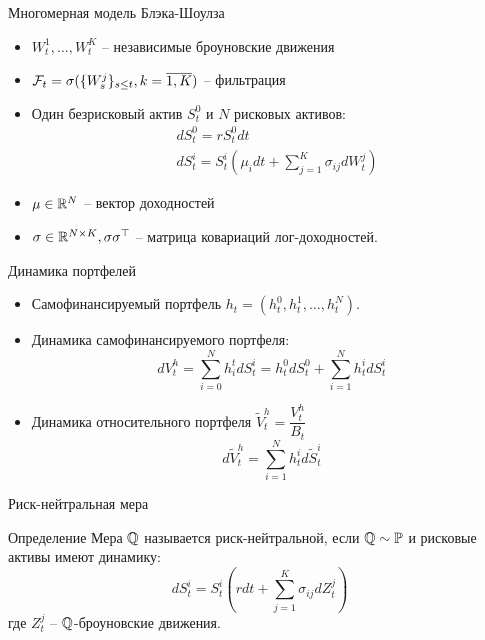 \documentclass[aspectratio=169]{beamer}
\begin{document}
\begin{frame}{Многомерная модель Блэка-Шоулза}
    \begin{itemize}
        \item $W_t^1, \ldots, W_t^K$ -- независимые броуновские движения
        \item $\mathcal{F}_t = \sigma(\{W_s^j\}_{s\leq t}, k=\overline{1,K})$ -- фильтрация
        \item Один безрисковый актив $S_t^0$ и $N$ рисковых активов:
        \begin{align*}
            &dS^0_t = r S^0_t dt \\
            &dS^i_t = S^i_t \left( \mu_i dt + \sum_{j=1}^K \sigma_{ij} dW_t^j \right)
        \end{align*}
        \item $\mu \in \mathbb{R}^N$ -- вектор доходностей
        \item $\sigma \in \mathbb{R}^{N\times K}, \sigma \sigma^{\top}$ -- матрица ковариаций лог-доходностей.
    \end{itemize}
\end{frame}

\begin{frame}{Динамика портфелей}
    \begin{itemize}
        \item Самофинансируемый портфель $h_t = (h_t^0, h_t^1, \ldots, h_t^N)$.
        \item Динамика самофинансируемого портфеля:
        $$
            dV_t^h = \sum_{i=0}^N h^t_i dS_t^i = h_t^0 dS^0_t + \sum_{i=1}^N h_t^i dS_t^i
        $$
        \item Динамика относительного портфеля $\tilde{V}^h_t = \dfrac{V_t^h}{B_t}$
        $$
            d\tilde{V}_t^h = \sum_{i=1}^N h_t^i d\tilde{S}_t^i
        $$
    \end{itemize}
\end{frame}

\begin{frame}{Риск-нейтральная мера}
    \begin{block}{Определение}
        Мера $\mathbb{Q}$ называется риск-нейтральной, если $\mathbb{Q} \sim \mathbb{P}$ и рисковые активы имеют динамику:
        $$
            dS^i_t = S^i_t \left( r dt  + \sum_{j=1}^K \sigma_{ij} dZ_t^j \right)
        $$где $Z_t^j$ -- $\mathbb{Q}$-броуновские движения.
    \end{block}
\end{frame}
\end{document}
